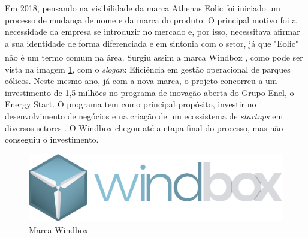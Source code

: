 Em 2018, pensando na visibilidade da marca Athenas Eolic foi iniciado um processo de mudança de nome e da marca do produto. O principal motivo foi a necessidade da empresa se introduzir no mercado e, por isso, necessitava afirmar a sua identidade de forma diferenciada e em sintonia com o setor, já que "Eolic" não é um termo comum na área. Surgiu assim a marca Windbox \textsuperscript{\textregistered}, como pode ser vista na imagem \ref{Fig:ilustracaoMarcaWindbox}, com o \textit{slogan}: Eficiência em gestão operacional de parques eólicos. Neste mesmo ano, já com a nova marca, o projeto concorreu a um investimento de 1,5 milhões no programa de inovação aberta do Grupo Enel, o Energy Start. O programa tem como principal propósito, investir no desenvolvimento de negócios e na criação de um ecossistema de \textit{startups} em diversos setores \cite{enerl-energy-start}. O Windbox chegou até a etapa final do processo, mas não conseguiu o investimento.

\begin{figure}[htbp!] \begin{center}
\includegraphics[width=0.5\linewidth]{./figuras/marca-windbox}
\caption{Marca Windbox}
\label{Fig:ilustracaoMarcaWindbox}
\end{center} 
\end{figure}